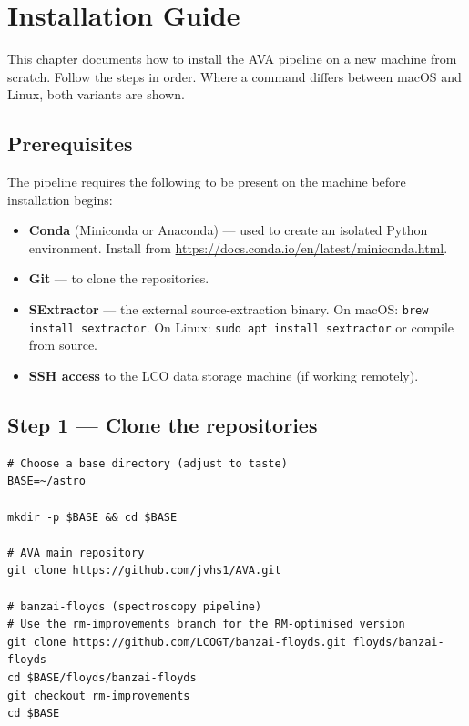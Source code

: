\documentclass[12pt,a4paper]{article}
\begin{document}

\section{Installation Guide}
\label{sec:install}

This chapter documents how to install the AVA pipeline on a new machine from
scratch.  Follow the steps in order.  Where a command differs between macOS
and Linux, both variants are shown.

\subsection{Prerequisites}

The pipeline requires the following to be present on the machine before
installation begins:

\begin{itemize}
  \item \textbf{Conda} (Miniconda or Anaconda) --- used to create an isolated
        Python environment.  Install from
        \url{https://docs.conda.io/en/latest/miniconda.html}.
  \item \textbf{Git} --- to clone the repositories.
  \item \textbf{SExtractor} --- the external source-extraction binary.
        On macOS: \texttt{brew install sextractor}.
        On Linux: \texttt{sudo apt install sextractor} or compile from source.
  \item \textbf{SSH access} to the LCO data storage machine (if working
        remotely).
\end{itemize}

\subsection{Step 1 --- Clone the repositories}

\begin{lstlisting}[style=shell]
# Choose a base directory (adjust to taste)
BASE=~/astro

mkdir -p $BASE && cd $BASE

# AVA main repository
git clone https://github.com/jvhs1/AVA.git

# banzai-floyds (spectroscopy pipeline)
# Use the rm-improvements branch for the RM-optimised version
git clone https://github.com/LCOGT/banzai-floyds.git floyds/banzai-floyds
cd $BASE/floyds/banzai-floyds
git checkout rm-improvements
cd $BASE
\end{lstlisting}
\end{document}
